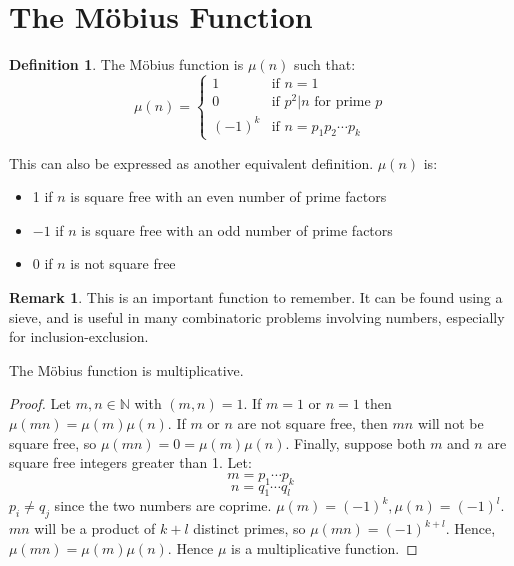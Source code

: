 \documentclass[12pt,letterpaper]{book}
\theoremstyle{definition}
\newtheorem{definition}{Definition} %
\newtheorem*{remark}{Remark}
\newcommand{\N}{\mathbb{N}}
\begin{document}
\section{The M\"{o}bius Function}

\begin{definition}
  The M\"{o}bius function is $\mu(n)$ such that:
  \[\mu(n) = \begin{cases}
    1 & \text{if } n = 1 \\
    0 & \text{if } p^2 |n \text{ for prime } p \\
    (-1)^k & \text{if } n = p_1p_2 \cdots p_k
  \end{cases}\]
\end{definition}

This can also be expressed as another equivalent definition. $\mu(n)$ is:
\begin{itemize}
  \item 1 if $n$ is square free with an even number of prime factors
  \item $-1$ if $n$ is square free with an odd number of prime factors
  \item 0 if $n$ is not square free
\end{itemize}

\begin{remark}
  This is an important function to remember. It can be found using a sieve, and is useful in many combinatoric problems involving numbers, especially for inclusion-exclusion.
\end{remark}

\begin{theorem}
  The M\"{o}bius function is multiplicative.
\end{theorem}
\begin{proof}
  Let $m,n \in \N$ with $(m,n) = 1$. If $m=1$ or $n=1$ then $\mu(mn) = \mu(m)\mu(n)$. If $m$ or $n$ are not square free, then $mn$ will not be square free, so $\mu(mn) = 0 = \mu(m)\mu(n)$. Finally, suppose both $m$ and $n$ are square free integers greater than 1. Let:
  \[m= p_1 \cdots p_k\]
  \[n = q_1 \cdots q_l\]
  $p_i \neq q_j$ since the two numbers are coprime. $\mu(m) = (-1)^k, \mu(n) = (-1)^l$. $mn$ will be a product of $k+l$ distinct primes, so $\mu(mn) = (-1)^{k+l}$. Hence, $\mu(mn) = \mu(m)\mu(n)$. Hence $\mu$ is a multiplicative function.
\end{proof}
\end{document}
